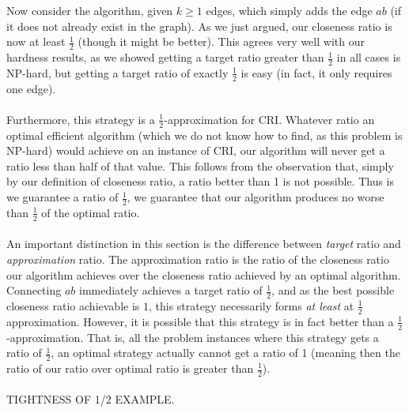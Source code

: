 Now consider the algorithm, given $k\geq 1$ edges, which simply adds the edge $ab$ (if it does not already exist in the graph). As we just argued, our closeness ratio is now at least $\frac{1}{2}$ (though it might be better). This agrees very well with our hardness results, as we showed getting a target ratio greater than $\frac{1}{2}$ in all cases is NP-hard, but getting a target ratio of exactly $\frac{1}{2}$ is easy (in fact, it only requires one edge). \\\\
Furthermore, this strategy is a $\frac{1}{2}$-approximation for CRI. Whatever ratio an optimal efficient algorithm (which we do not know how to find, as this problem is NP-hard) would achieve on an instance of CRI, our algorithm will never get a ratio less than half of that value. This follows from the observation that, simply by our definition of closeness ratio, a ratio better than 1 is not possible. Thus is we guarantee a ratio of $\frac{1}{2}$, we guarantee that our algorithm produces no worse than $\frac{1}{2}$ of the optimal ratio. \\\\
An important distinction in this section is the difference between \textit{target} ratio and \textit{approximation} ratio. The approximation ratio is the ratio of the closeness ratio our algorithm achieves over the closeness ratio achieved by an optimal algorithm. Connecting $ab$ immediately achieves a target ratio of $\frac{1}{2}$, and as the best possible closeness ratio achievable is $1$, this strategy necessarily forms \textit{at least} at $\frac{1}{2}$ approximation. However, it is possible that this strategy is in fact better than a $\frac{1}{2}$-approximation. That is, all the problem instances where this strategy gets a ratio of $\frac{1}{2}$, an optimal strategy actually cannot get a ratio of 1 (meaning then the ratio of our ratio over optimal ratio is greater than $\frac{1}{2}$).\\\\
TIGHTNESS OF 1/2 EXAMPLE.